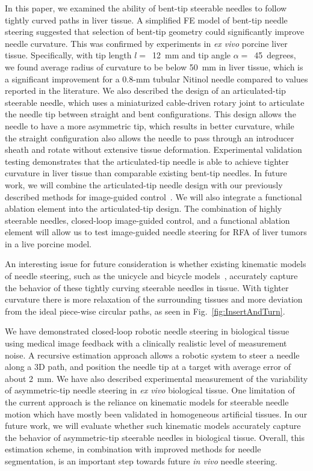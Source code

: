 

In this paper, we examined the ability of bent-tip steerable needles to follow tightly curved paths in liver tissue. A simplified FE model of bent-tip needle steering suggested that selection of bent-tip geometry could significantly improve needle curvature. This was confirmed by experiments in \textit{ex vivo} porcine liver tissue. Specifically, with tip length $l =$~12~mm and tip angle $\alpha =$~45~degrees, we found average radius of curvature to be below 50~mm in liver tissue, which is a significant improvement for a 0.8-mm tubular Nitinol needle compared to values reported in the literature. We also described the design of an articulated-tip steerable needle, which uses a miniaturized cable-driven rotary joint to articulate the needle tip between straight and bent configurations. This design allows the needle to have a more asymmetric tip, which results in better curvature, while the straight configuration also allows the needle to pass through an introducer sheath and rotate without extensive tissue deformation. Experimental validation testing demonstrates that the articulated-tip needle is able to achieve tighter curvature in liver tissue than comparable existing bent-tip needles. In future work, we will combine the articulated-tip needle design with our previously described methods for image-guided control~\cite{Adebar2014}. We will also integrate a functional ablation element into the articulated-tip design. The combination of highly steerable needles, closed-loop image-guided control, and a functional ablation element will allow us to test image-guided needle steering for RFA of liver tumors in a live porcine model.

An interesting issue for future consideration is whether existing kinematic models of needle steering, such as the unicycle and bicycle models~\cite{Park2005,Webster2006}, accurately capture the behavior of these tightly curving steerable needles in tissue. With tighter curvature there is more relaxation of the surrounding tissues and more deviation from the ideal piece-wise circular paths, as seen in Fig.~\ref{fig:InsertAndTurn}.

We have demonstrated closed-loop robotic needle steering in biological tissue using medical image feedback with a clinically realistic level of measurement noise. A recursive estimation approach allows a robotic system to steer a needle along a 3D path, and position the needle tip at a target with average error of about 2~mm. We have also described experimental measurement of the variability of asymmetric-tip needle steering in \textit{ex vivo} biological tissue. One limitation of the current approach is the reliance on kinematic models for steerable needle motion which have mostly been validated in homogeneous artificial tissues. In our future work, we will evaluate whether such kinematic models accurately capture the behavior of asymmetric-tip steerable needles in biological tissue. Overall, this estimation scheme, in combination with improved methods for needle segmentation, is an important step towards future \textit{in vivo} needle steering.

